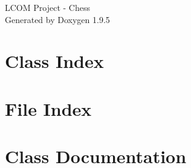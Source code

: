 \documentclass[twoside]{book}
\newcommand{\+}{\discretionary{\mbox{\scriptsize$\hookleftarrow$}}{}{}}
\newcommand{\clearemptydoublepage}{%
    \newpage{\pagestyle{empty}\cleardoublepage}%
  }
\begin{document}
  \raggedbottom
    \hypersetup{pageanchor=false,
                bookmarksnumbered=true,
                pdfencoding=unicode
               }
  \begin{titlepage}
  \vspace*{7cm}
  \begin{center}%
  {\Large LCOM Project -\/ Chess}\\
  \vspace*{1cm}
  {\large Generated by Doxygen 1.9.5}\\
  \end{center}
  \end{titlepage}
  \clearemptydoublepage
  \tableofcontents
  \clearemptydoublepage
  \hypersetup{pageanchor=true}
\chapter{Class Index}

\chapter{File Index}

\chapter{Class Documentation}

















\end{document}
